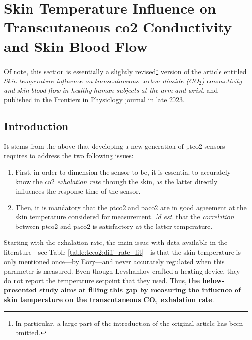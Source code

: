 \section[Skin Temp. Influence on Tc. \texorpdfstring{\gls{co2}}{CO2} Conductivity]{Skin Temperature Influence on Transcutaneous \texorpdfstring{\gls{co2}}{CO2} Conductivity and Skin Blood Flow}\label{sect:tcco2:frontiers_article}

Of note, this section is essentially a slightly revised\footnote{In particular, a large part of the introduction of the original article has been omitted.} version of the article entitled \textit{Skin temperature influence on transcutaneous carbon dioxide (CO$_\textit{2}$) conductivity and skin blood flow in healthy human subjects at the arm and wrist}, and published in the Frontiers in Physiology journal in late 2023\cite{dervieux2023rate}.

\subsection{Introduction}\label{sect:tcco2:frontiers_intro}

It stems from the above that developing a new generation of \gls{ptco2} sensors requires to address the two following issues:
\begin{enumerate}
	\item First, in order to dimension the sensor-to-be, it is essential to accurately know the \gls{co2} \emph{exhalation rate} through the skin, as the latter directly influences the response time of the sensor.
	\item Then, it is mandatory that the \gls{ptco2} and \gls{paco2} are in good agreement at the skin temperature considered for measurement. \textit{Id est}, that the \emph{correlation} between \gls{ptco2} and \gls{paco2} is satisfactory at the latter temperature.
\end{enumerate}

Starting with the exhalation rate, the main issue with data available in the literature---see Table \ref{table:tcco2:diff_rate_lit}---is that the skin temperature is only mentioned once---by Eöry\cite{eory1984}---and never accurately regulated when this parameter is measured\cite{fitzgerald1957}. Even though Levshankov \etal{}\cite{levshankov1983} crafted a heating device, they do not report the temperature setpoint that they used. Thus, \textbf{the below-presented study aims at filling this gap by measuring the influence of skin temperature on the transcutaneous $\mathbf{CO_2}$ exhalation rate}.

